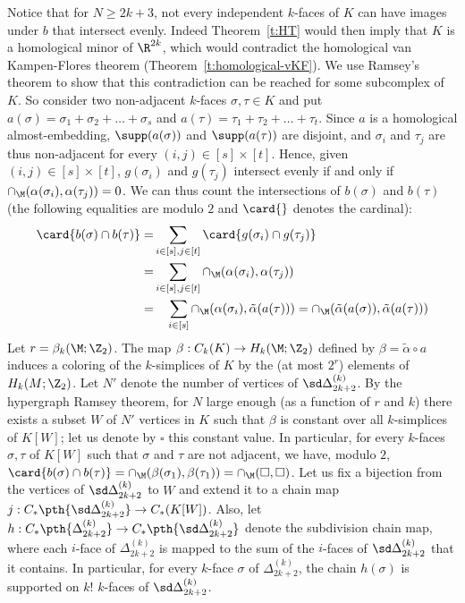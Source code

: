 %
\noindent
Notice that for $N \ge 2k+3$, not every independent $k$-faces of $K$ can have images under $b$ that intersect evenly. Indeed Theorem~\ref{t:HT} would then imply that $K$ is a homological minor of $\R^{2k}$, which would contradict the homological van Kampen-Flores theorem (Theorem~\ref{t:homological-vKF}). We use Ramsey's theorem to show that this contradiction can be reached for some subcomplex of $K$.
%
\medskip
%
So consider two non-adjacent $k$-faces $\sigma,\tau \in K$ and put $a(\sigma) = \sigma_1+\sigma_2+\ldots +\sigma_s$ and $a(\tau) =\tau_1+\tau_2+\ldots+\tau_t$. Since $a$ is a homological almost-embedding, $\supp(a(\sigma))$ and $\supp(a(\tau))$ are disjoint, and $\sigma_i$ and $\tau_j$ are thus non-adjacent for every $(i,j) \in [s] \times [t]$. Hence, given $(i,j) \in [s] \times [t]$, $g(\sigma_i)$ and $g(\tau_j)$ intersect evenly if and only if $\cap_{\M}(\alpha(\sigma_i),\alpha(\tau_j)) = 0$. We can thus count the intersections of $b(\sigma)$ and $b(\tau)$ (the following equalities are modulo $2$ and $\card{}$ denotes the cardinal):
%
\[\begin{aligned}
\card{b(\sigma) \cap b(\tau)} = &\sum_{i \in [s], j \in [t]} \card{g(\sigma_i) \cap g(\tau_j)}\\
= &\sum_{i \in [s], j \in [t]} \cap_{\M}(\alpha(\sigma_i),\alpha(\tau_j))\\
= &\quad\sum_{i \in [s]} \cap_{\M}(\alpha(\sigma_i),\tilde{\alpha}(a(\tau)))= \cap_{\M}(\tilde{\alpha}(a(\sigma)),\tilde{\alpha}(a(\tau)))
\end{aligned}  \]
%
\medskip
%
Let $r = \beta_k(\M;\Z_2)$. The map $\beta: C_k(K) \to H_k(\M;\Z_2)$ defined by $\beta = \tilde{\alpha} \circ a$ induces a coloring of the $k$-simplices of $K$ by the (at most $2^r$) elements of $H_k(M;\Z_2)$. Let $N'$ denote the number of vertices of $\sd \Delta_{2k+2}^{(k)}$. By the hypergraph Ramsey theorem, for $N$ large enough (as a function of $r$ and $k$) there exists a subset $W$ of $N'$ vertices in $K$ such that $\beta$ is constant over all $k$-simplices of $K[W]$; let us denote by $\square$ this constant value. In particular, for every $k$-faces $\sigma,\tau$ of $K[W]$ such that $\sigma$ and $\tau$ are not adjacent, we have, modulo $2$, $\card{b(\sigma) \cap b(\tau)} = \cap_{\M}(\beta(\sigma_1),\beta(\tau_1)) = \cap_{\M}(\square,\square)$. Let us fix a bijection from the vertices of $\sd\Delta_{2k+2}^{(k)}$ to $W$ and extend it to a chain map $j:C_*\pth{\sd\Delta_{2k+2}^{(k)}}\to C_*(K[W])$. Also, let $h:C_*\pth{\Delta_{2k+2}^{(k)}}\to C_*\pth{\sd \Delta_{2k+2}^{(k)}}$ denote the subdivision chain map, where each $i$-face of $\Delta_{2k+2}^{(k)}$ is mapped to the sum of the $i$-faces of $\sd \Delta_{2k+2}^{(k)}$ that it contains. In particular, for every $k$-face $\sigma$ of $\Delta_{2k+2}^{(k)}$, the chain $h(\sigma)$ is supported on $k!$ $k$-faces of $\sd \Delta_{2k+2}^{(k)}$.
